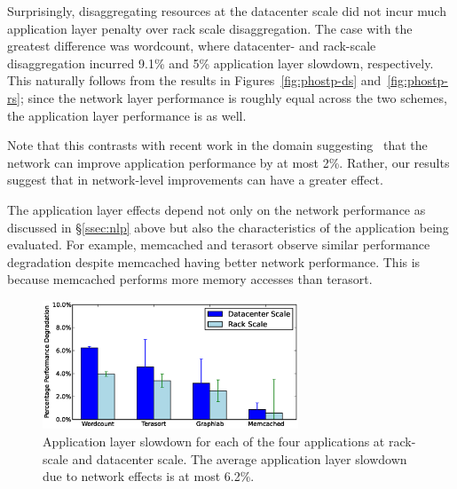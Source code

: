 Surprisingly, disaggregating resources at the datacenter scale did not incur much application layer penalty over rack scale disaggregation. The case with the greatest difference was wordcount, where datacenter- and rack-scale disaggregation incurred 9.1\% and 5\% application layer slowdown, respectively. This naturally follows from the results in Figures~\ref{fig:phostp-ds} and~\ref{fig:phostp-rs}; since the network layer performance is roughly equal across the two schemes, the application layer performance is as well. 

Note that this contrasts with recent work in the \pdis domain suggesting~\cite{kay-nsdi15} that the network can improve application performance by at most 2\%. Rather, our results suggest that in \dis network-level improvements can have a greater effect.

The application layer effects depend not only on the network performance as discussed in \S\ref{ssec:nlp} above but also the characteristics of the application being evaluated. For example, memcached and terasort observe similar performance degradation despite memcached having better network performance. This is because memcached performs more memory accesses than terasort. 

%
\begin{figure}
  \centering
    \includegraphics[width = 3in]{img/slowdown.eps} 
  \caption{\small{Application layer slowdown for each of the four applications at rack-scale and datacenter scale. The average application layer slowdown due to network effects is at most 6.2\%.}}
  \label{fig:appfabric}
\end{figure}
%


%

